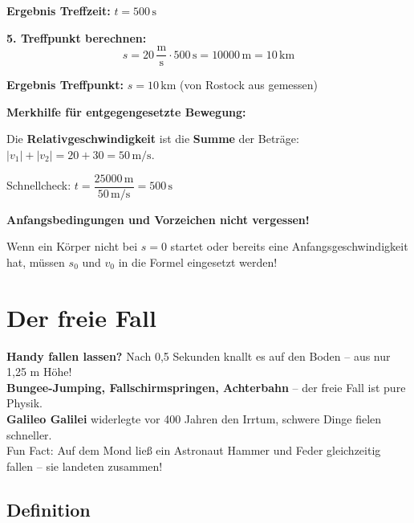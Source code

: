 \documentclass[11pt,a4paper]{article}
\begin{document}
\begin{beispiel}
\textbf{Ergebnis Treffzeit:} $\boxed{t = 500\,\mathrm{s}}$

\textbf{5. Treffpunkt berechnen:}
\[
s = 20\,\frac{\mathrm{m}}{\mathrm{s}} \cdot 500\,\mathrm{s} = 10000\,\mathrm{m} = 10\,\mathrm{km}
\]

\textbf{Ergebnis Treffpunkt:} $\boxed{s = 10\,\mathrm{km}}$ (von Rostock aus gemessen)

\begin{tipp}
\textbf{Merkhilfe für entgegengesetzte Bewegung:}

Die \textbf{Relativgeschwindigkeit} ist die \textbf{Summe} der Beträge: $|v_1| + |v_2| = 20 + 30 = 50\,\mathrm{m/s}$.

Schnellcheck: $t = \dfrac{25000\,\mathrm{m}}{50\,\mathrm{m/s}} = 500\,\mathrm{s}$ \checkmark
\end{tipp}
\end{beispiel}

\begin{warnung}
\textbf{Anfangsbedingungen und Vorzeichen nicht vergessen!}

Wenn ein Körper nicht bei $s = 0$ startet oder bereits eine Anfangsgeschwindigkeit hat, müssen $s_0$ und $v_0$ in die Formel eingesetzt werden!
\end{warnung}

\newpage
\section{Der freie Fall}

\begin{alltag}
\textbf{Handy fallen lassen?} Nach 0,5 Sekunden knallt es auf den Boden -- aus nur 1,25 m Höhe!\\[0.3em]
\textbf{Bungee-Jumping, Fallschirmspringen, Achterbahn} -- der freie Fall ist pure Physik.\\[0.3em]
\textbf{Galileo Galilei} widerlegte vor 400 Jahren den Irrtum, schwere Dinge fielen schneller.\\[0.3em]
Fun Fact: Auf dem Mond ließ ein Astronaut Hammer und Feder gleichzeitig fallen -- sie landeten zusammen!
\end{alltag}

\subsection{Definition}
\end{document}
